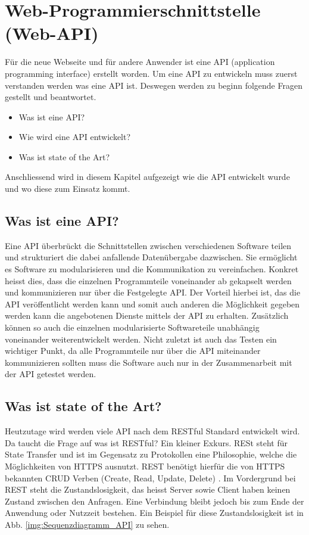\section{ Web-Programmierschnittstelle (Web-API)}
Für die neue Webseite und für andere Anwender ist eine API (application programming interface) erstellt worden. Um eine API zu entwickeln muss zuerst verstanden werden was eine API ist. Deswegen werden zu beginn folgende Fragen gestellt und beantwortet.
\begin{itemize}
\item Was ist eine API?
\item Wie wird eine API entwickelt?
\item Was ist state of the Art?
\end{itemize}

Anschliessend wird in diesem Kapitel aufgezeigt wie die API entwickelt wurde und wo diese zum Einsatz kommt.

\subsection{Was ist eine API?}
Eine API überbrückt die Schnittstellen zwischen verschiedenen Software teilen und strukturiert die dabei anfallende Datenübergabe dazwischen. Sie ermöglicht es Software zu modularisieren und die Kommunikation zu vereinfachen. Konkret heisst dies, dass die einzelnen Programmteile  voneinander ab gekapselt werden und kommunizieren nur über die Festgelegte API. Der Vorteil hierbei ist, das die API veröffentlicht werden kann und somit auch anderen die Möglichkeit gegeben werden kann die angebotenen Dienste mittels der API zu erhalten. Zusätzlich können so auch die einzelnen modularisierte Softwareteile unabhängig voneinander weiterentwickelt werden. Nicht zuletzt ist auch das Testen ein wichtiger Punkt, da alle Programmteile nur über die API miteinander kommunizieren sollten muss die Software auch nur in der Zusammenarbeit mit der API getestet werden.

\subsection{Was ist state of the Art?}
Heutzutage wird werden viele API nach dem RESTful Standard entwickelt wird. Da taucht die Frage auf was ist RESTful? Ein kleiner Exkurs. RESt steht für State Transfer und ist im Gegensatz zu Protokollen eine Philosophie, welche die Möglichkeiten von HTTPS ausnutzt. REST benötigt hierfür die von HTTPS bekannten CRUD Verben (Create, Read, Update, Delete) \cite{LornaJaneMitchell2013oreilly}. Im Vordergrund bei REST steht die Zustandslosigkeit, das heisst Server sowie Client haben keinen Zustand zwischen den Anfragen. Eine Verbindung bleibt jedoch bis zum Ende der Anwendung oder Nutzzeit bestehen. Ein Beispiel für diese Zustandslosigkeit ist in Abb. \ref{img:Sequenzdiagramm_API} zu sehen.\\

